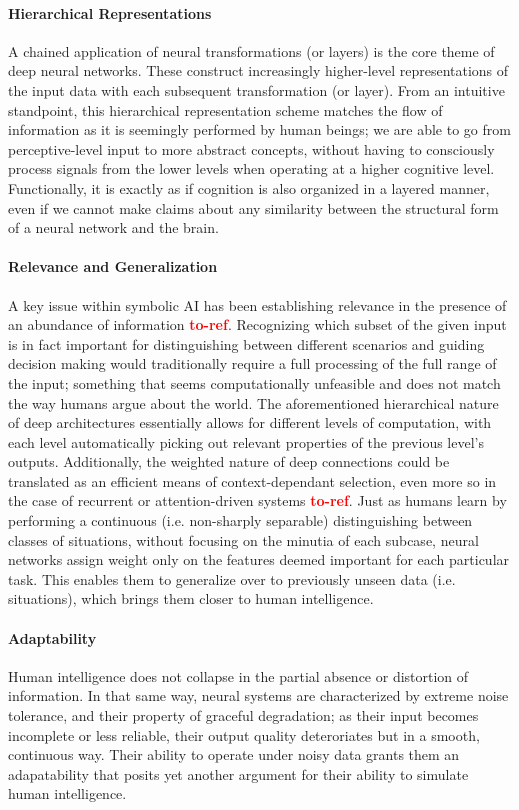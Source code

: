 \documentclass[]{article}
\newcommand\toref{\textcolor{red}{\bf{to-ref}}}
\begin{document}
\paragraph{Hierarchical Representations}
A chained application of neural transformations (or layers) is the core theme of deep neural networks. These construct increasingly higher-level representations of the input data with each subsequent transformation (or layer). From an intuitive standpoint, this hierarchical representation scheme matches the flow of information as it is seemingly performed by human beings; we are able to go from perceptive-level input to more abstract concepts, without having to consciously process signals from the lower levels when operating at a higher cognitive level. Functionally, it is exactly as if cognition is also organized in a layered manner, even if we cannot make claims about any similarity between the structural form of a neural network and the brain.

\paragraph{Relevance and Generalization}
A key issue within symbolic AI has been establishing relevance in the presence of an abundance of information \toref. Recognizing which subset of the given input is in fact important for distinguishing between different scenarios and guiding decision making would traditionally require a full processing of the full range of the input; something that seems computationally unfeasible and does not match the way humans argue about the world. The aforementioned hierarchical nature of deep architectures essentially allows for different levels of computation, with each level automatically picking out relevant properties of the previous level's outputs. Additionally, the weighted nature of deep connections could be translated as an efficient means of context-dependant selection, even more so in the case of recurrent or attention-driven systems \toref . Just as humans learn by performing a continuous (i.e. non-sharply separable) distinguishing between classes of situations, without focusing on the minutia of each subcase, neural networks assign weight only on the features deemed important for each particular task. This enables them to generalize over to previously unseen data (i.e. situations), which brings them closer to human intelligence.

\paragraph{Adaptability}
Human intelligence does not collapse in the partial absence or distortion of information. In that same way, neural systems are characterized by extreme noise tolerance, and their property of graceful degradation; as their input becomes incomplete or less reliable, their output quality deteroriates but in a smooth, continuous way. Their ability to operate under noisy data grants them an adapatability that posits yet another argument for their ability to simulate human intelligence. 
\end{document}
